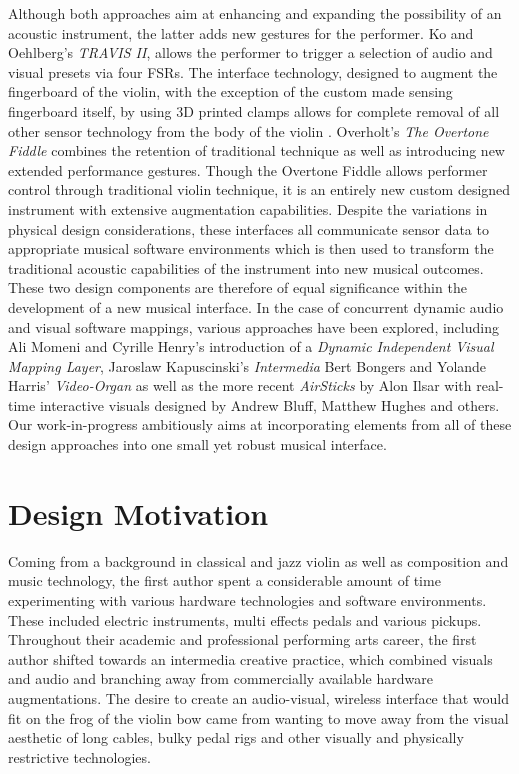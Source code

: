 \documentclass{nime-alternate}
\begin{document}
Although both approaches aim at enhancing and expanding the possibility of an acoustic instrument\cite{machover:interactive}, the latter adds new gestures for the performer\cite{bevilacqua:augmented}\cite{overholt:advancements}.
Ko and Oehlberg's \textit{TRAVIS II}\cite{ko:touch}, allows the performer to trigger a selection of audio and visual presets via four FSRs. The interface technology, designed to augment the fingerboard of the violin,  with the exception of the custom made sensing fingerboard itself, by using 3D printed clamps allows for complete removal of all other sensor technology from the body of the violin . Overholt's \textit{The Overtone Fiddle}\cite{overholt:overtone} combines the retention of traditional technique as well as introducing new extended performance gestures. Though the Overtone Fiddle allows performer control through traditional violin technique, it is an entirely new custom designed instrument with extensive augmentation capabilities.
Despite the variations in physical design considerations, these interfaces all communicate sensor data to appropriate musical software environments which is then used to transform
the traditional acoustic capabilities of the instrument into new musical outcomes\cite{machover:hyperinstrument}. These two design components are therefore of equal significance within the development of a new musical interface.
In the case of concurrent dynamic audio and visual software mappings, various approaches have been explored, including Ali Momeni and Cyrille Henry's introduction of a \textit{Dynamic Independent Visual Mapping Layer}\cite{momeni:dynamic}, Jaroslaw Kapuscinski's \textit{Intermedia}\cite{savery:intermedia}\cite{kapuscinski:7mudras} Bert Bongers and Yolande Harris' \textit{Video-Organ}\cite{bongers:structured} as well as the more recent \textit{AirSticks}\cite{ilsar:airsticks} by Alon Ilsar with real-time interactive visuals designed by Andrew Bluff, Matthew Hughes and others. Our work-in-progress ambitiously aims at incorporating elements from all of these design approaches into one small yet robust musical interface.


\section{Design Motivation}

Coming from a background in classical and jazz violin as well as composition and music technology, the first author spent a considerable amount of time experimenting with various hardware technologies and software environments. These included electric instruments, multi effects pedals and various pickups. Throughout their academic and professional performing arts career, the first author shifted towards an intermedia creative practice, which combined visuals and audio and branching away from commercially available hardware augmentations. The desire to create an audio-visual, wireless interface that would fit on the frog of the violin bow came from wanting to move away from the visual aesthetic of long cables, bulky pedal rigs and other visually and physically restrictive technologies. 
\end{document}
